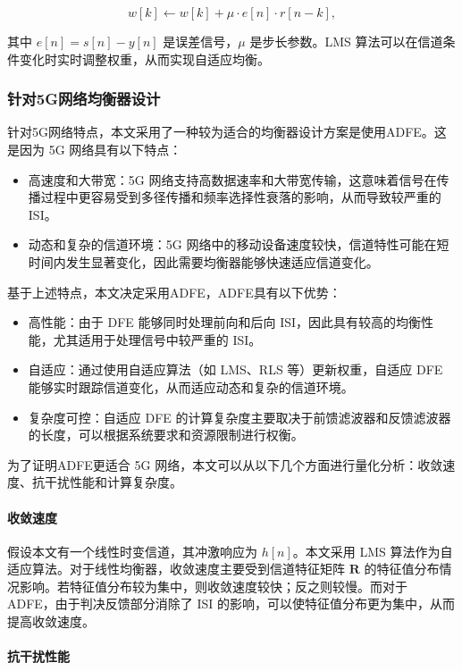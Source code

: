 \documentclass[UTF8,a4paper,12pt]{ctexart}
\numberwithin{equation}{section}
\begin{document}
\begin{equation}
	w[k] \leftarrow w[k] + \mu \cdot e[n] \cdot r[n-k],
\end{equation}

其中 $e[n] = s[n] - y[n]$ 是误差信号，$\mu$ 是步长参数。LMS 算法可以在信道条件变化时实时调整权重，从而实现自适应均衡。

\subsubsection{针对5G网络均衡器设计}针对5G网络特点，本文采用了一种较为适合的均衡器设计方案是使用ADFE。这是因为 5G 网络具有以下特点：
\begin{itemize}
	\item 高速度和大带宽：5G 网络支持高数据速率和大带宽传输，这意味着信号在传播过程中更容易受到多径传播和频率选择性衰落的影响，从而导致较严重的ISI。
	\item 动态和复杂的信道环境：5G 网络中的移动设备速度较快，信道特性可能在短时间内发生显著变化，因此需要均衡器能够快速适应信道变化。
\end{itemize}
基于上述特点，本文决定采用ADFE，ADFE具有以下优势：
\begin{itemize}
	\item 高性能：由于 DFE 能够同时处理前向和后向 ISI，因此具有较高的均衡性能，尤其适用于处理信号中较严重的 ISI。
	\item 自适应：通过使用自适应算法（如 LMS、RLS 等）更新权重，自适应 DFE 能够实时跟踪信道变化，从而适应动态和复杂的信道环境。
	\item 复杂度可控：自适应 DFE 的计算复杂度主要取决于前馈滤波器和反馈滤波器的长度，可以根据系统要求和资源限制进行权衡。
\end{itemize}
为了证明ADFE更适合 5G 网络，本文可以从以下几个方面进行量化分析：收敛速度、抗干扰性能和计算复杂度。

\paragraph{收敛速度}
假设本文有一个线性时变信道，其冲激响应为 $h[n]$。本文采用 LMS 算法作为自适应算法。对于线性均衡器，收敛速度主要受到信道特征矩阵 $\mathbf{R}$ 的特征值分布情况影响。若特征值分布较为集中，则收敛速度较快；反之则较慢。而对于 ADFE，由于判决反馈部分消除了 ISI 的影响，可以使特征值分布更为集中，从而提高收敛速度。

\paragraph{抗干扰性能}
\end{document}
